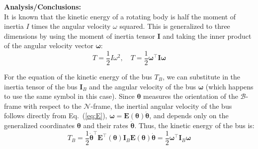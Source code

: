 \documentclass[titlepage]{article}
\begin{document}
\textbf{Analysis/Conclusions:}\\

It is known that the kinetic energy of a rotating body is half the moment of inertia $I$ times the angular velocity $\omega$ squared. This is generalized to three dimensions by using the moment of inertia tensor $\boldsymbol{I}$ and taking the inner product of the angular velocity vector $\boldsymbol{\omega}$:
\begin{equation}
	T=\frac{1}{2}I\omega^2,\quad T=\frac{1}{2}\boldsymbol{\omega}^\top\boldsymbol{I}\boldsymbol{\omega}
\end{equation}

\begin{mdframed}[linewidth=1pt, innertopmargin=10pt, innerbottommargin=10pt]
	For the equation of the kinetic energy of the bus $T_B$, we can substitute in the inertia tensor of the bus $\boldsymbol{I}_B$ and the angular velocity of the bus $\boldsymbol{\omega}$ (which happens to use the same symbol in this case). Since $\boldsymbol{\theta}$ measures the orientation of the $\mathcal{B}$-frame with respect to the $\mathcal{N}$-frame, the inertial angular velocity of the bus follows directly from Eq.~(\ref{eq:E}), $\boldsymbol{\omega}=\boldsymbol{E}(\boldsymbol{\theta})\dot{\boldsymbol{\theta}}$, and depends only on the generalized coordinates $\boldsymbol{\theta}$ and their rates $\dot{\boldsymbol{\theta}}$. Thus, the kinetic energy of the bus is:
	\begin{equation}
		T_B=\frac{1}{2}\dot{\boldsymbol{\theta}}^\top\boldsymbol{E}^\top(\boldsymbol{\theta})\boldsymbol{I}_B\boldsymbol{E}(\boldsymbol{\theta})\dot{\boldsymbol{\theta}}=\frac{1}{2}\boldsymbol{\omega}^\top\boldsymbol{I}_B\boldsymbol{\omega}
		\label{eq:TB}
	\end{equation}
\end{mdframed}
\end{document}
